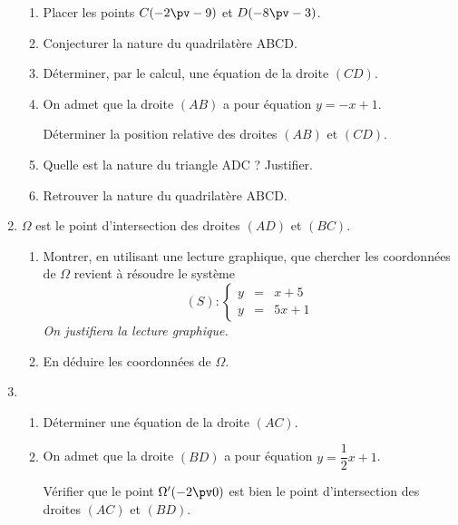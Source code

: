 \documentclass[12pt,french]{article}
\begin{document}
\begin{spacing}{1.2}
\begin{enumerate}[label=\arabic*.]
\begin{enumerate}[label=\alph*)]
	\item Placer les points $C(-2\pv -9)$ et $D(-8\pv -3)$.
	
	\item Conjecturer la nature du quadrilatère ABCD.
	
	\item Déterminer, par le calcul, une équation de la droite $(CD)$.
	
	\item On admet que la droite $(AB)$ a pour équation $y=-x+1$.
	
	Déterminer la position relative des droites $(AB)$ et $(CD)$.
	
	\item Quelle est la nature du triangle ADC ? Justifier.
	
	\item Retrouver la nature du quadrilatère ABCD.
	
	\end{enumerate}

\item $\Omega$ est le point d'intersection des droites $(AD)$ et $(BC)$.

	\begin{enumerate}[label=\alph*)]
	\item Montrer, en utilisant une lecture graphique, que chercher les coordonnées de $\Omega$ revient à résoudre le système \[(S) : \left\{\begin{array}{rcl}
	y&=&x+5\\
	y&=&5x+1
	\end{array}\right.\]
	\textit{On justifiera la lecture graphique.}
		
	\item En déduire les coordonnées de $\Omega$.
	
	\end{enumerate}

\item 
	\begin{enumerate}[label=\alph*)]
	\item Déterminer une équation de la droite $(AC)$.
	
	\item On admet que la droite $(BD)$ a pour équation $y=\dfrac{1}{2}x+1$.
	
	Vérifier que le point $\Omega '(-2\pv 0)$ est bien le point d'intersection des droites $(AC)$ et $(BD)$.
	
	\end{enumerate}


\end{enumerate}
\end{spacing}
\end{document}
